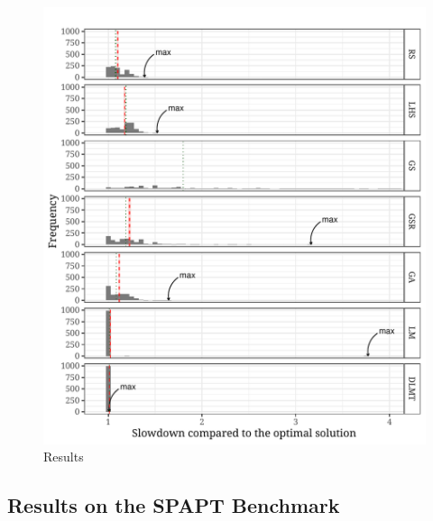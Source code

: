 \documentclass[conference]{IEEEtran}
\begin{document}
\begin{center}
\begin{figure}[ht]
\centering
\includegraphics[width=.9\columnwidth]{./img/comparison_histogram.pdf}
\caption{Results}
\end{figure}
\end{center}
\subsection{Results on the SPAPT Benchmark}
\label{sec:orgba2bc05}
\end{document}

